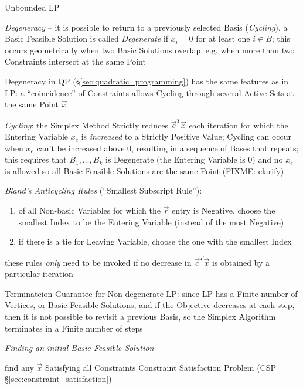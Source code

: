 Unbounded LP

\emph{Degeneracy} -- it is possible to return to a previously selected Basis
(\emph{Cycling}), a Basic Feasible Solution is called \emph{Degenerate} if $x_i
= 0$ for at least one $i \in B$; this occurs geometrically when two Basic
Solutions overlap, e.g. when more than two Constraints intersect at the same
Point

\fist Degeneracy in QP (\S\ref{sec:quadratic_programming}) has the same
features as in LP: a ``coincidence'' of Constraints allows Cycling through
several Active Sets at the same Point $\vec{x}$

\emph{Cycling}: the Simplex Method Strictly reduces $\vec{c}^T\vec{x}$ each
iteration for which the Entering Variable $x_e$ is \emph{increased} to a
Strictly Positive Value; Cycling can occur when $x_e$ can't be increased above
$0$, resulting in a sequence of Bases that repeats; this requires that $B_1,
\ldots, B_k$ is Degenerate (the Entering Variable is $0$) and no $x_e$ is
allowed so all Basic Feasible Solutions are the same Point
(FIXME: clarify)

\emph{Bland's Anticycling Rules} (``Smallest Subscript Rule''):
\begin{enumerate}
  \item of all Non-basic Variables for which the $\vec{r}$ entry is Negative,
    choose the smallest Index to be the Entering Variable (instead of the most
    Negative)
  \item if there is a tie for Leaving Variable, choose the one with the
    smallest Index
\end{enumerate}
these rules \emph{only} need to be invoked if no decrease in $\vec{c}^T\vec{x}$
is obtained by a particular iteration

Terminateion Guarantee for Non-degenerate LP: since LP has a Finite number of
Vertices, or Basic Feasible Solutions, and if the Objective decreases at each
step, then it is not possible to revisit a previous Basis, so the Simplex
Algorithm terminates in a Finite number of steps


\emph{Finding an initial Basic Feasible Solution}

find any $\vec{x}$ Satisfying all Constraints \fist Constraint Satisfaction
Problem (CSP \S\ref{sec:constraint_satisfaction})

